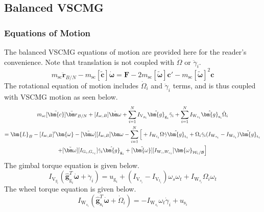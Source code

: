 \subsection{Balanced VSCMG}
\subsubsection{Equations of Motion}
The balanced VSCMG equations of motion are provided here for the reader's convenience. Note that translation is not coupled with $\dot{\Omega}$ or $\ddot{\gamma}_i$.
\begin{equation}\label{eq:vscmgTranslationSimpleBS_BACKSUBAPP}
m_\text{sc}\ddot{\bm r}_{B/N} - m_\text{sc}[\tilde{\bm{c}}]\dot{\bm \omega}
= \bm{F} - 2m_\text{sc}[\tilde{\bm{\omega}}]\bm{c}' - m_\text{sc}[\tilde{\bm{\omega}}]^2\bm{c}
\end{equation}
The rotational equation of motion includes $\dot{\Omega}_i$ and $\ddot{\gamma}_i$ terms, and is thus coupled with VSCMG motion as seen below.
\begin{multline}
m_{\text{\text{sc}}}[\tilde{\bm{c}}]\ddot{\bm r}_{B/N} + [I_{\text{sc},B}]\dot{\bm\omega}
+\sum\limits_{i=1}^{N}I_{\text{V}_{g_i}}\hat{\bm{g}}_{\text{g}_i} \ddot{\gamma}_i
+\sum\limits_{i=1}^{N}I_{\text{W}_{s_i}}\hat{\bm{g}}_{\text{s}_i} \dot{\Omega}_i
\\
= \bm{L}_B - [I_{\text{sc},B}]'\bm{\omega} - [\tilde{\bm\omega}][I_{\text{sc},B}]\bm\omega
-\sum\limits_{i=1}^{N} \Big[
+ I_{\text{W}_{t_i}}\Omega\dot{\gamma}\hat{\bm{g}}_{\text{t}_i} + \Omega_i\dot{\gamma}_i(I_{\text{W}_{s_i}}-I_{\text{W}_{t_i}})\hat{\bm{g}}_{\text{t}_i} \\+ [\tilde{\bm\omega}][I_{\text{G}_i,G_{c_i}}]\dot{\gamma}_i\hat{\bm{g}}_{\text{g}_i} + [\tilde{\bm{\omega}}][I_{\text{W}_i,W_{c_i}}]\bm{\omega}_{\mathcal{W}_i/\cal B}
\Big]
\label{eq:vscmgRotationSimpleBS_BACKSUBAPP}
\end{multline}
The gimbal torque equation is given below.
\begin{equation}
I_{\text{V}_{g_i}}(\hat{\bm g}_{\text{g}_i}^T\dot{\bm{\omega}}
+  \ddot{\gamma}_i)
= u_{\text{g}_i} + (I_{\text{V}_{s_i}}-I_{\text{V}_{t_i}})\omega_s\omega_t + I_{\text{W}_{s_i}}\Omega_i\omega_t
\label{eq:vscmgGimbalTorqueSimpleBS_BACKSUBAPP}
\end{equation}
The wheel torque equation is given below.
\begin{equation}
I_{\text{W}_{s_i}}(\hat{\bm g}_{\text{s}_i}^T\dot{\bm\omega} + \dot{\Omega}_i)
=-I_{\text{W}_{s_i}}\omega_t\dot{\gamma}_i + u_{\text{s}_i}
\label{eq:vscmgWheelTorqueSimpleBS_BACKSUBAPP}
\end{equation}

